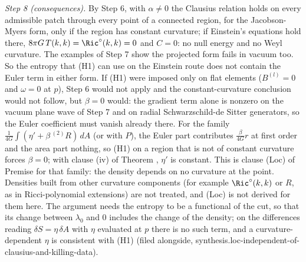 \emph{Step 8 (consequences).} By Step 6, with $\alpha \neq 0$ the Clausius relation holds on every admissible patch through every point of a connected region, for the Jacobson-Myers form, only if the region has constant curvature; if Einstein's equations hold there, $8\pi G\,T(k,k) = \Ric^{\circ}(k,k) = 0$ and $C = 0$: no null energy and no Weyl curvature. The examples of Step 7 show the projected form fails in vacuum too. So the entropy that (H1) can use on the Einstein route does not contain the Euler term in either form. If (H1) were imposed only on flat elements ($B^{(l)} = 0$ and $\omega = 0$ at $p$), Step 6 would not apply and the constant-curvature conclusion would not follow, but $\beta = 0$ would: the gradient term alone is nonzero on the vacuum plane wave of Step 7 and on radial Schwarzschild-de Sitter generators, so the Euler coefficient must vanish already there. For the family $\frac{1}{4G}\int(\eta' + \beta\,{}^{(2)}\!R)\,dA$ (or with $P$), the Euler part contributes $\frac{\beta}{4G}r$ at first order and the area part nothing, so (H1) on a region that is not of constant curvature forces $\beta = 0$; with clause (iv) of Theorem , $\eta'$ is constant. This is clause (Loc) of Premise  for that family: the density depends on no curvature at the point. Densities built from other curvature components (for example $\Ric^{\circ}(k,k)$ or $R$, as in Ricci-polynomial extensions) are not treated, and (Loc) is not derived for them here. The argument needs the entropy to be a functional of the cut, so that its change between $\lambda_{0}$ and $0$ includes the change of the density; on the differences reading $\delta S = \eta\,\delta A$ with $\eta$ evaluated at $p$ there is no such term, and a curvature-dependent $\eta$ is consistent with (H1) (filed alongside, synthesis.loc-independent-of-clausius-and-killing-data).

